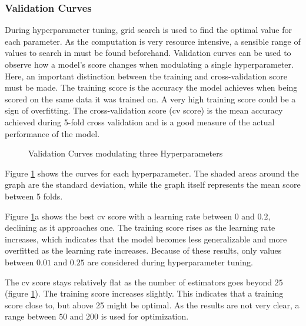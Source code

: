 \subsubsection{Validation Curves}

During hyperparameter tuning, grid search is used to find the optimal value for each parameter.
As the computation is very resource intensive, a sensible range of values to search in must be found beforehand.
Validation curves can be used to observe how a model's score changes when modulating a single hyperparameter.
Here, an important distinction between the training and cross-validation score must be made.
The training score is the accuracy the model achieves when being scored on the same data it was trained on.
A very high training score could be a sign of overfitting.
The cross-validation score (cv score) is the mean accuracy achieved during 5-fold cross validation and is a good measure
of the actual performance of the model.

\begin{figure}[H]
    \centering
    \qquad
    \qquad
    \caption{Validation Curves modulating three Hyperparameters}%
    \label{fig:Validation Curves modulating 3 hyperparameters}%
\end{figure}

Figure \ref{fig:Validation Curves modulating 3 hyperparameters} shows the curves for each hyperparameter. The shaded
areas around the graph are the standard deviation, while the graph itself represents the mean score between 5 folds.

Figure \ref{fig:Validation Curves modulating 3 hyperparameters}a shows the best cv score with a learning rate
between $0$ and $0.2$, declining as it approaches one.
The training score rises as the learning rate increases, which indicates that the model becomes less generalizable and
more overfitted as the learning rate increases.
Because of these results, only values between $0.01$ and $0.25$ are considered during hyperparameter tuning.

The cv score stays relatively flat as the number of estimators goes beyond $25$ (figure \ref{fig:Validation Curves modulating 3 hyperparameters}).
The training score increases slightly.
This indicates that a training score close to, but above 25 might be optimal. As the results are not very clear,
a range between $50$ and $200$ is used for optimization.

